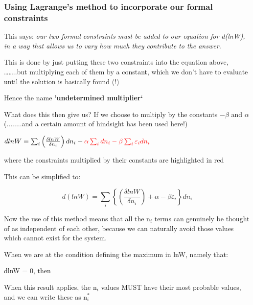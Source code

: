 \documentclass[a4paper,12pt,titlepage]{article}
\begin{document}
\begin{frame}
\frametitle{Using Lagrange's method to incorporate our formal constraints}
This says: \textit{our two formal constraints must be added to our equation for d(lnW), in a way that allows us to vary how much they contribute to the answer. }\par\medskip
 
This is done by just putting these two constraints into the equation above, ……..but multiplying each of them by a constant, which we don't have to evaluate until the solution is basically found (!)\par\medskip
 Hence the name \textbf{'undetermined multiplier‘}\par

What does this then give us? If we choose to multiply by the constants
\(-\beta\) and \(\alpha\) (........and a certain amount of hindsight has been used here!)\par\medskip
 
\(dlnW  = \sum_i \left( \frac{\delta lnW}{\delta n_i}\right) dn_i +  \textcolor{red}{\alpha \sum_i dn_i  -  \beta \sum_i \varepsilon_i  dn_i}\)           

where the constraints multiplied by their constants are highlighted in red
\end{frame}

\begin{frame}[allowframebreaks]
This can be simplified to:\par\bigskip
 
\[d(lnW)  = \sum_i \left\{\left(\frac{\delta lnW}{\delta n_i}\right)   +  \alpha  -  \beta \varepsilon_i \right\} dn_i \]
  
Now the use of this method means that all the n\(_i\) terms can genuinely be thought of as independent of each other, because we can naturally avoid those values which cannot exist for the system.\par\bigskip

When we are at the condition defining the maximum in lnW, namely that:\par

dlnW  =  0, then
\begin{center}
\end{center}
When this result applies, the n\(_i\) values MUST have their most probable values, and we can write these as n\(_i^*\)
\end{frame}
\end{document}
